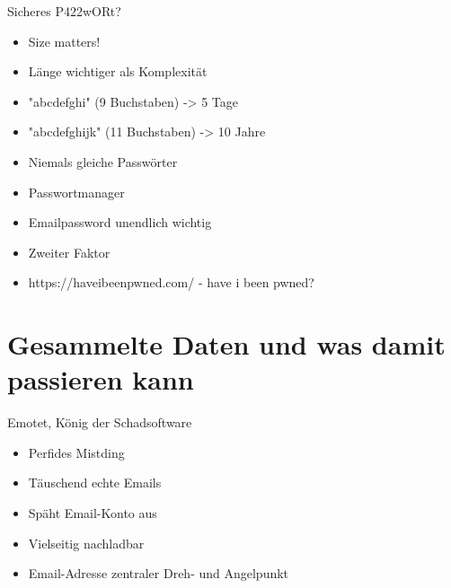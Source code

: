 \documentclass[10pt]{beamer}
\begin{document}
%
%
\begin{frame}[fragile]{Sicheres P422wORt?}
\begin{itemize}
    \item Size matters!
    \item Länge wichtiger als Komplexität
    \item "abcdefghi" (9 Buchstaben) -> \alert{5 Tage}
    \item "abcdefghijk" (11 Buchstaben) -> \alert{10 Jahre}
    \item Niemals gleiche Passwörter
    \item \alert{Passwortmanager}
    \item \alert{Emailpassword unendlich wichtig}
    \item \alert{Zweiter Faktor}
    \item \alert{https://haveibeenpwned.com/ - have i been pwned?}
  \end{itemize}
\end{frame}

\section{Gesammelte Daten und was damit passieren kann}

%
%
\begin{frame}[fragile]{Emotet, König der Schadsoftware}
\begin{itemize}
    \item Perfides Mistding
    \item Täuschend echte Emails
    \item Späht Email-Konto aus
    \item Vielseitig nachladbar
    \item Email-Adresse zentraler Dreh- und Angelpunkt
  \end{itemize}
\end{frame}
\end{document}
